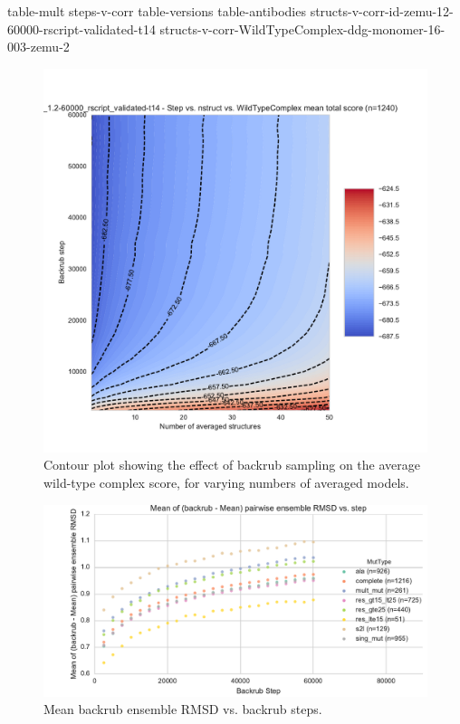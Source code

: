 \documentclass{article}
\begin{document}
\renewcommand{\thefigure}{S\arabic{figure}}
\setcounter{figure}{0}
\renewcommand{\thetable}{S\arabic{table}}
\setcounter{table}{0}

{table-mult}
{steps-v-corr}
{table-versions}
{table-antibodies}
{structs-v-corr-id-zemu-12-60000-rscript-validated-t14}
{structs-v-corr-WildTypeComplex-ddg-monomer-16-003-zemu-2}

\begin{figure}
  \centering
  \includegraphics[width=\textwidth,keepaspectratio]{figures/wildtypecomplex-scores-complete.pdf}
  \caption{
    Contour plot showing the effect of backrub sampling on the average wild-type complex score, for varying numbers of averaged models.
  } \label{fig:wildtypecomplex-scores-complete}
\end{figure}

\begin{figure}
  \centering
  \includegraphics[width=\textwidth,keepaspectratio]{figures/t14-mean-ensemble-error.pdf}
  \caption{
    Mean backrub ensemble RMSD vs. backrub steps.
  } \label{fig:t14-mean-ensemble}
\end{figure}
\end{document}
